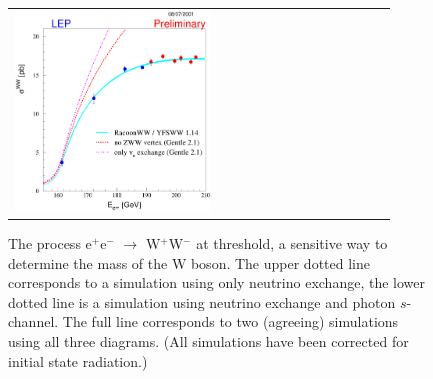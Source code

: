 \documentclass[12pt]{article}
\begin{document}
\begin{figure}
  \begin{center}
    \begin{tabular}{p{0.55\linewidth} c p{0.35\linewidth}}
      \begin{minipage}{\linewidth}
        \includegraphics[width=\linewidth]{s01_sww_no_tgc.eps}
      \end{minipage} & &
      \begin{minipage}{\linewidth}

	\caption{The process e$^+$e$^-$ $\to$ W$^+$W$^-$ at threshold,
	a sensitive way to determine the mass of the W boson. The
	upper dotted line corresponds to a simulation using only
	neutrino exchange, the lower dotted line is a simulation using
	neutrino exchange and photon $s$-channel. The full line
	corresponds to two (agreeing) simulations using all three
	diagrams. (All simulations have been corrected for initial
	state radiation.)}

      \end{minipage} \\
    \end{tabular}
  \end{center}

  \label{fig:w_mass}
\end{figure}
\end{document}
